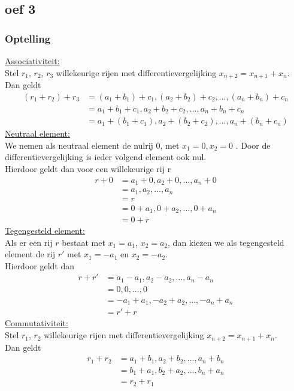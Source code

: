 \documentclass[lineaire_algebra_oplossingen.tex]{subfiles}
\begin{document}
\subsection*{oef 3}
\subsubsection*{Optelling}
\underline{Associativiteit:}\\
Stel $r_1$, $r_2$, $r_3$ willekeurige rijen met differentievergelijking $x_{n + 2} = x_{n + 1} + x_n$.\\
Dan geldt
\begin{align*}
    (r_1 + r_2) + r_3 &= (a_1 + b_1) + c_1 , (a_2 + b_2) + c_2 , ... , (a_n + b_n)+ c_n\\
    &= a_1 + b_1 + c_1, a_2 + b_2 + c_2, ... , a_n + b_n + c_n\\
    &= a_1 + (b_1 + c_1), a_2 + (b_2 + c_2), ..., a_n + (b_n + c_n)
\end{align*}
\underline{Neutraal element:}\\
We nemen als neutraal element de nulrij 0, met $x_1 = 0, x_2 = 0$ . 
Door de differentievergelijking is ieder volgend element ook nul.\\
Hierdoor geldt dan voor een willekeurige rij r
\begin{align*}
  r + 0 &= a_1 + 0, a_2 + 0, ..., a_n + 0\\
  &= a_1, a_2, ..., a_n\\
  &= r\\
  &= 0 + a_1, 0 + a_2, ..., 0 + a_n\\
  &= 0 + r
\end{align*}
\underline{Tegengesteld element:}\\
Als er een rij $r$ bestaat met $x_1 = a_1$, $x_2 = a_2$, dan kiezen we als tegengesteld element de rij $r'$ met $x_1 = -a_1$ en $x_2 = -a_2$.\\
Hierdoor geldt dan
\begin{align*}
    r + r' &= a_1 - a_1, a_2 - a_2, ...,a_n - a_n\\
    &= 0, 0, ..., 0\\
    &= -a_1 + a_1, -a_2 + a_2, ..., -a_n + a_n\\
    &= r' + r
\end{align*}
\underline{Commutativiteit:}\\
Stel $r_1$, $r_2$ willekeurige rijen met differentievergelijking $x_{n + 2} = x_{n + 1} + x_n$.\\
Dan geldt
\begin{align*}
    r_1 + r_2 &= a_1 + b_1, a_2 + b_2, ..., a_n + b_n\\
    &= b_1 + a_1, b_2 + a_2, ..., b_n + a_n\\
    &= r_2 + r_1
\end{align*}
\end{document}
